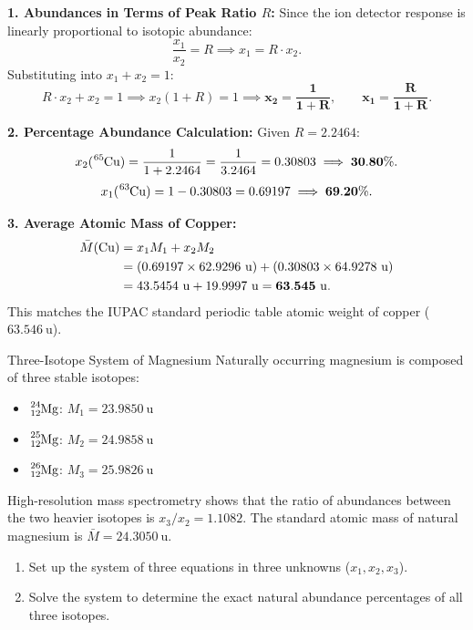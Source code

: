 \begin{tabletworkspace}[5.0cm]
\end{tabletworkspace}

\begin{solution}
\textbf{1. Abundances in Terms of Peak Ratio $R$:}
Since the ion detector response is linearly proportional to isotopic abundance:
\[
\frac{x_1}{x_2} = R \implies x_1 = R \cdot x_2.
\]
Substituting into $x_1 + x_2 = 1$:
\[
R \cdot x_2 + x_2 = 1 \implies x_2(1 + R) = 1 \implies \mathbf{x_2 = \frac{1}{1 + R}}, \qquad \mathbf{x_1 = \frac{R}{1 + R}}.
\]

\textbf{2. Percentage Abundance Calculation:}
Given $R = 2.2464$:
\[
x_2(\ce{^{65}Cu}) = \frac{1}{1 + 2.2464} = \frac{1}{3.2464} = 0.30803 \implies \mathbf{30.80\%}.
\]
\[
x_1(\ce{^{63}Cu}) = 1 - 0.30803 = 0.69197 \implies \mathbf{69.20\%}.
\]

\textbf{3. Average Atomic Mass of Copper:}
\begin{align*}
\bar{M}(\ce{Cu}) &= x_1 M_1 + x_2 M_2 \\
                 &= (0.69197 \times 62.9296\ \mathrm{u}) + (0.30803 \times 64.9278\ \mathrm{u}) \\
                 &= 43.5454\ \mathrm{u} + 19.9997\ \mathrm{u} = \mathbf{63.545\ \mathrm{u}}.
\end{align*}
This matches the IUPAC standard periodic table atomic weight of copper ($63.546\ \mathrm{u}$).
\end{solution}

\begin{exercise}{Three-Isotope System of Magnesium}
Naturally occurring magnesium is composed of three stable isotopes:
\begin{itemize}[itemsep=1pt]
  \item $\ce{^{24}_{12}Mg}$: $M_1 = 23.9850\ \mathrm{u}$
  \item $\ce{^{25}_{12}Mg}$: $M_2 = 24.9858\ \mathrm{u}$
  \item $\ce{^{26}_{12}Mg}$: $M_3 = 25.9826\ \mathrm{u}$
\end{itemize}
High-resolution mass spectrometry shows that the ratio of abundances between the two heavier isotopes is $x_3 / x_2 = 1.1082$. The standard atomic mass of natural magnesium is $\bar{M} = 24.3050\ \mathrm{u}$.
\begin{enumerate}[leftmargin=1.5em,itemsep=2pt]
  \item Set up the system of three equations in three unknowns ($x_1, x_2, x_3$).
  \item Solve the system to determine the exact natural abundance percentages of all three isotopes.
\end{enumerate}
\end{exercise}

